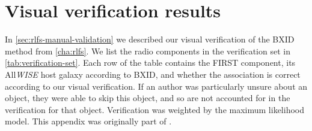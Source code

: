 \section{Visual verification results}
\label{sec:rlfs-verification-appendix}
  
  In \autoref{sec:rlfs-manual-validation} we described our visual verification of the BXID method from \autoref{cha:rlfs}. We list the radio components in the verification set in \autoref{tab:verification-set}. Each row of the table contains the FIRST component, its All\emph{WISE} host galaxy according to BXID, and whether the association is correct according to our visual verification. If an author was particularly unsure about an object, they were able to skip this object, and so are not accounted for in the verification for that object. Verification was weighted by the \citet{dawid79em} maximum likelihood model. This appendix was originally part of \citep{alger21rlfs}.

